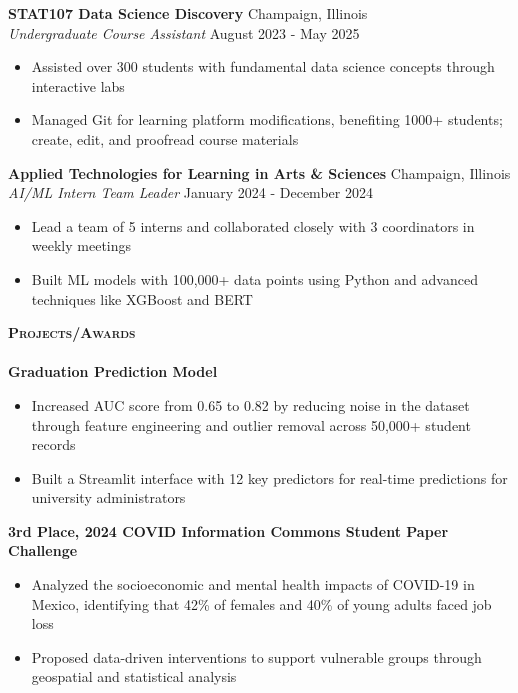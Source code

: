\documentclass[a4paper]{article}
\newcommand{\lineunder} {
    \vspace*{-8pt} \\
    \hspace*{-18pt} \hrulefill \\
}
\newcommand{\header} [1] {
    {\hspace*{-18pt}\vspace*{6pt} \textsc{#1}}
    \vspace*{-6pt} \lineunder
}
\begin{document}
\vspace{1mm}

\textbf{STAT107 Data Science Discovery} 
\hfill Champaign, Illinois\\
\textit{Undergraduate Course Assistant} \hfill August 2023 - May 2025\\
    \begin{itemize}[noitemsep]
    \item Assisted over 300 students with fundamental data science concepts through interactive labs
    \item Managed Git for learning platform modifications, 
    benefiting 1000+ students; create, edit, and proofread course materials
    \end{itemize}

\vspace{1mm}

\textbf{Applied Technologies for Learning in Arts \& Sciences}
\hfill Champaign, Illinois\\
\textit{AI/ML Intern Team Leader} \hfill January 2024 - December 2024\\
    \begin{itemize}[noitemsep]
        \item Lead a team of 5 interns and collaborated closely with 3 coordinators in weekly meetings
        \item Built ML models with 100,000+ data points using Python and advanced techniques like XGBoost and BERT
    \end{itemize}

\vspace*{1mm}

\header{\textbf{Projects/Awards}}

\textbf{Graduation Prediction Model}
\begin{itemize}[noitemsep]
    \item Increased AUC score from 0.65 to 0.82 by reducing noise in the dataset through feature 
    engineering and outlier removal across 50,000+ student records
    \item Built a Streamlit interface with 12 key predictors for
    real-time predictions for university administrators
\end{itemize}

\textbf{3rd Place, 2024 COVID Information Commons Student Paper Challenge} 
    \begin{itemize}[noitemsep]
        \item Analyzed the socioeconomic and mental health impacts of COVID-19 in Mexico, identifying that 42\% of females and 40\% of young adults faced job loss
        \item Proposed data-driven interventions to support vulnerable groups through geospatial and statistical analysis
    \end{itemize}
\end{document}

